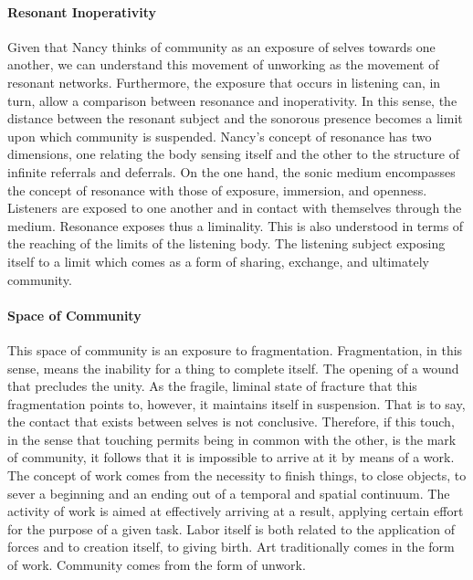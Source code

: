 \paragraph{Resonant Inoperativity}
Given that Nancy thinks of community as an exposure of selves towards one another, we can understand this movement of unworking as the movement of resonant networks. Furthermore, the exposure that occurs in listening can, in turn, allow a comparison between resonance and inoperativity. In this sense, the distance between the resonant subject and the sonorous presence becomes a limit upon which community is suspended. Nancy's concept of resonance has two dimensions, one relating the body sensing itself and the other to the structure of infinite referrals and deferrals. On the one hand, the sonic medium encompasses the concept of resonance with those of exposure, immersion, and openness. Listeners are exposed to one another and in contact with themselves through the medium. Resonance exposes thus a liminality. This is also understood in terms of the reaching of the limits of the listening body. The listening subject exposing itself to a limit which comes as a form of sharing, exchange, and ultimately community. 

\paragraph{Space of Community}
This space of community is an exposure to fragmentation. Fragmentation, in this sense, means the inability for a thing to complete itself. The opening of a wound that precludes the unity. As the fragile, liminal state of fracture that this fragmentation points to, however, it maintains itself in suspension. That is to say, the contact that exists between selves is not conclusive. Therefore, if this touch, in the sense that touching permits being in common with the other, is the mark of community, it follows that it is impossible to arrive at it by means of a work. The concept of work comes from the necessity to finish things, to close objects, to sever a beginning and an ending out of a temporal and spatial continuum. The activity of work is aimed at effectively arriving at a result, applying certain effort for the purpose of a given task. Labor itself is both related to the application of forces and to creation itself, to giving birth. Art traditionally comes in the form of work. Community comes from the form of unwork.


